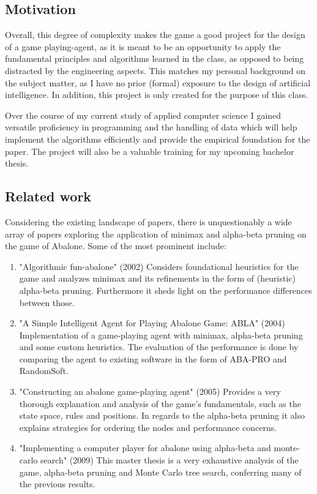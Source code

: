 \documentclass{llncs}
\begin{document}
\subsection{Motivation}
Overall, this degree of complexity makes the game a good project for the design of a game playing-agent, as it is meant to be an opportunity to apply the fundamental principles and algorithms learned in the class, as opposed to being distracted by the engineering aspects. This matches my personal background on the subject matter, as I have no prior (formal) exposure to the design of artificial intelligence. In addition, this project is only created for the purpose of this class.

Over the course of my current study of applied computer science I gained versatile proficiency in programming and the handling of data which will help implement the algorithms efficiently and provide the empirical foundation for the paper. The project will also be a valuable training for my upcoming bachelor thesis.

\subsection{Related work}

Considering the existing landscape of papers, there is unquestionably a wide array of papers exploring the application of minimax and alpha-beta pruning on the game of Abalone. Some of the most prominent include:

\begin{enumerate}
	\item "Algorithmic fun-abalone" (2002) Considers foundational heuristics for the game and analyzes minimax and its refinements in the form of (heuristic) alpha-beta pruning. Furthermore it sheds light on the performance differences between those. \cite{aichholzer_algorithmic_2002}
	\item "A Simple Intelligent Agent for Playing Abalone Game: ABLA" (2004) Implementation of a game-playing agent with minimax, alpha-beta pruning and some custom heuristics. The evaluation of the performance is done by comparing the agent to existing software in the form of ABA-PRO and RandomSoft.\cite{ozcan_simple_2004}
	\item "Constructing an abalone game-playing agent" (2005) Provides a very thorough explanation and analysis of the game's fundamentals, such as the state space, rules and positions. In regards to the alpha-beta pruning it also explains strategies for ordering the nodes and performance concerns. \cite{lemmens_constructing_2005}
	\item "Implementing a computer player for abalone using alpha-beta and monte-carlo search" (2009) This master thesis is a very exhaustive analysis of the game, alpha-beta pruning and Monte Carlo tree search, conferring many of the previous results. \cite{chorus_implementing_2009}
\end{enumerate}
\end{document}
